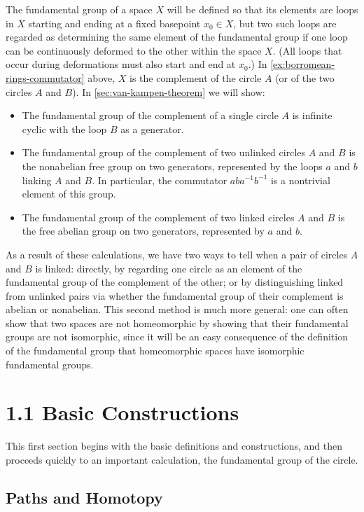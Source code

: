 The fundamental group of a space $X$ will be defined so that its elements are loops
in $X$ starting and ending at a fixed basepoint $x_0 \in X$, but two such loops are
regarded as determining the same element of the fundamental group if one loop can
be continuously deformed to the other within the space $X$. (All loops that occur
during deformations must also start and end at $x_0$.) In \cref{ex:borromean-rings-commutator}
above, $X$ is the complement of the circle $A$ (or of the two circles $A$ and $B$).
In \cref{sec:van-kampen-theorem} we will show:
\begin{itemize}
\item The fundamental group of the complement of a single circle $A$ is infinite cyclic
with the loop $B$ as a generator.
\item The fundamental group of the complement of two unlinked circles $A$ and $B$ is
the nonabelian free group on two generators, represented by the loops $a$ and $b$
linking $A$ and $B$. In particular, the commutator $aba^{-1}b^{-1}$ is a nontrivial element
of this group.
\item The fundamental group of the complement of two linked circles $A$ and $B$ is the
free abelian group on two generators, represented by $a$ and $b$.
\end{itemize}

As a result of these calculations, we have two ways to tell when a pair of circles $A$
and $B$ is linked: directly, by regarding one circle as an element of the fundamental
group of the complement of the other; or by distinguishing linked from unlinked
pairs via whether the fundamental group of their complement is abelian or
nonabelian. This second method is much more general: one can often show that two
spaces are not homeomorphic by showing that their fundamental groups are not
isomorphic, since it will be an easy consequence of the definition of the fundamental
group that homeomorphic spaces have isomorphic fundamental groups.

\section{1.1 Basic Constructions}
\label{sec:basic-constructions}

This first section begins with the basic definitions and constructions, and then
proceeds quickly to an important calculation, the fundamental group of the circle.

\subsection*{Paths and Homotopy}

